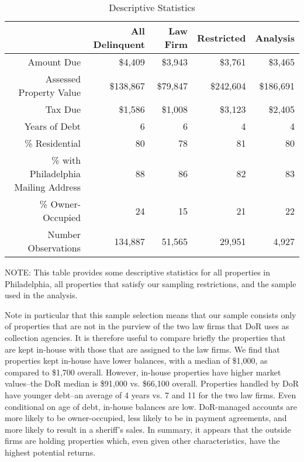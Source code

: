 \documentclass[12pt,titlepage]{article}
\begin{document}
\begin{table}[htb]
\begin{center}
\centering
\caption{Descriptive Statistics} 
\label{table:descriptives}
\begin{tabular}{|r|r|r|r|r|}
  \hline
 & All Delinquent & Law Firm & Restricted & Analysis \\ 
  \hline
Amount Due & \$4,409 & \$3,943 & \$3,761 & \$3,465 \\ 
  Assessed Property Value & \$138,867 & \$79,847 & \$242,604 & \$186,691 \\ 
  Tax Due & \$1,586 & \$1,008 & \$3,123 & \$2,405 \\ 
  Years of Debt & 6 & 6 & 4 & 4 \\ 
  \% Residential & 80 & 78 & 81 & 80 \\ 
  \% with Philadelphia Mailing Address & 88 & 86 & 82 & 83 \\ 
  \% Owner-Occupied & 24 & 15 & 21 & 22 \\ 
  Number Observations & 134,887 & 51,565 & 29,951 & 4,927 \\ 
   \hline
\end{tabular}
\end{center}
NOTE: This table provides some descriptive statistics for all
properties in Philadelphia, all properties that satisfy our sampling
restrictions, and the sample used in the analysis.
\end{table}


Note in particular that this sample selection means that our sample
consists only of properties that are not in the purview of the two law
firms that DoR uses as collection agencies. It is therefore useful to
compare briefly the properties that are kept in-house with those that
are assigned to the law firms. We find that properties kept in-house
have lower balances, with a median of \$1,000, as compared to \$1,700
overall. However, in-house properties have higher market values--the
DoR median is \$91,000 vs. \$66,100 overall. Properties handled by DoR
have younger debt--an average of 4 years vs. 7 and 11 for the two law
firms.  Even conditional on age of debt, in-house balances are low.
DoR-managed accounts are more likely to be owner-occupied, less likely
to be in payment agreements, and more likely to result in a sheriff's
sales. In summary, it appears that the outside firms are holding
properties which, even given other characteristics, have the highest
potential returns.
\end{document}

